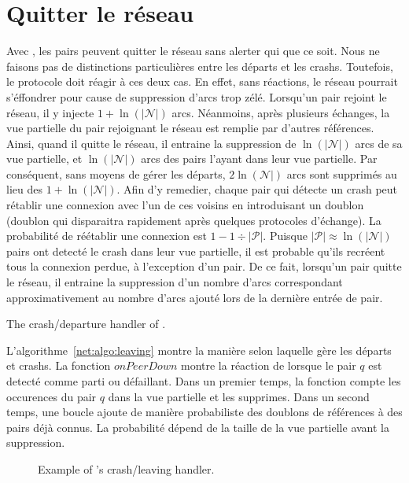 \section{Quitter le réseau}

Avec \SPRAY, les pairs peuvent quitter le réseau sans alerter qui que ce
soit. Nous ne faisons pas de distinctions particulières entre les départs et les
crashs. Toutefois, le protocole doit réagir à ces deux cas. En effet, sans
réactions, le réseau pourrait s'éffondrer pour cause de suppression d'arcs trop
zélé. Lorsqu'un pair rejoint le réseau, il y injecte $1+\ln(|\mathcal{N}|)$
arcs. Néanmoins, après plusieurs échanges, la vue partielle du pair rejoignant
le réseau est remplie par d'autres références. Ainsi, quand il quitte le réseau,
il entraine la suppression de $\ln(|\mathcal{N}|)$ arcs de sa vue partielle, et
$\ln(|\mathcal{N}|)$ arcs des pairs l'ayant dans leur vue partielle. Par
conséquent, sans moyens de gérer les départs, $2\ln(\mathcal{N}|)$ arcs sont
supprimés au lieu des $1+\ln(|\mathcal{N}|)$. Afin d'y remedier, chaque pair qui
détecte un crash peut rétablir une connexion avec l'un de ces voisins en
introduisant un doublon (doublon qui disparaitra rapidement après quelques
protocoles d'échange). La probabilité de réétablir une connexion est
$1-1\div{|\mathcal{P}|}$. Puisque ${|\mathcal{P}|}\approx \ln(|\mathcal{N}|)$
pairs ont detecté le crash dans leur vue partielle, il est probable qu'ils
recréent tous la connexion perdue, à l'exception d'un pair. De ce fait,
lorsqu'un pair quitte le réseau, il entraine la suppression d'un nombre d'arcs
correspondant approximativement au nombre d'arcs ajouté lors de la dernière
entrée de pair.

\begin{algorithm}[h]
  
  \caption{\label{net:algo:leaving}The crash/departure handler of \SPRAY.}
\end{algorithm}

L'algorithme~\ref{net:algo:leaving} montre la manière selon laquelle \SPRAY
gère les départs et crashs. La fonction $onPeerDown$ montre la réaction de
\SPRAY lorsque le pair $q$ est detecté comme parti ou défaillant. Dans un
premier temps, la fonction compte les occurences du pair $q$ dans la vue
partielle et les supprimes. Dans un second temps, une boucle ajoute de manière
probabiliste des doublons de références à des pairs déjà connus. La probabilité
dépend de la taille de la vue partielle avant la suppression.

\begin{figure*}
  \centering
  \hspace{40pt}
  \hspace{40pt}
  \caption{\label{net:fig:leavingexample}Example of \SPRAY's crash/leaving
    handler. }
\end{figure*}

